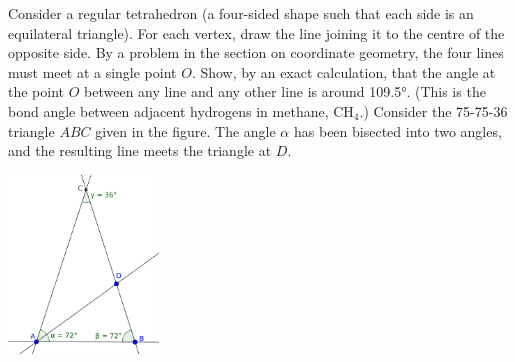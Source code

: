 \begin{questions}
  \clearpage
  \question Consider a regular tetrahedron (a four-sided shape such that each side is an equilateral triangle).
            For each vertex, draw the line joining it to the centre of the opposite side. By a problem in the
            section on coordinate geometry, the four lines must meet at a single point $ O $. Show, by an exact
            calculation, that the angle at the point $ O $ between any line and any other line is around \ang{109.5}.
            (This is the bond angle between adjacent hydrogens in methane, $ \mathrm{CH}_4 $.)
  \question Consider the 75-75-36 triangle $ ABC $ given in the figure. The
            angle $ \alpha $ has been bisected into two angles, and the resulting line meets
            the triangle at $ D $.
            \begin{center}
              \includegraphics[width=0.3\textwidth]{golden}
            \end{center}

\end{questions}


